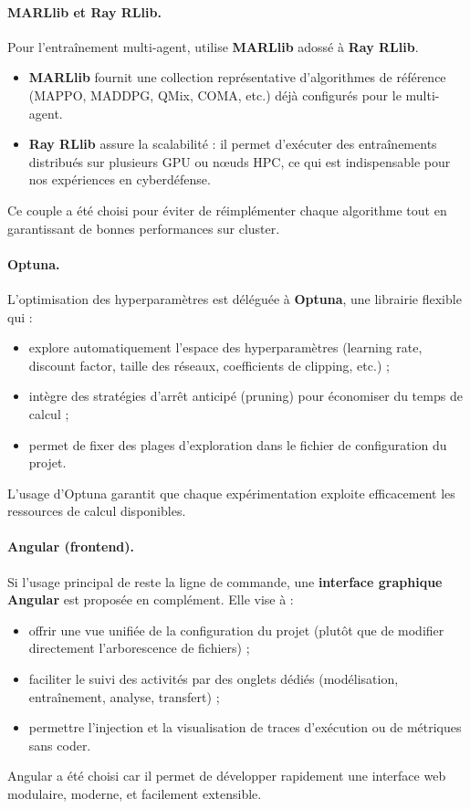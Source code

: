 \paragraph{MARLlib et Ray RLlib.}
Pour l'entraînement multi-agent,  utilise \textbf{MARLlib} adossé à \textbf{Ray RLlib}.
\begin{itemize}
  \item \textbf{MARLlib} fournit une collection représentative d'algorithmes de référence (MAPPO, MADDPG, QMix, COMA, etc.) déjà configurés pour le multi-agent.
  \item \textbf{Ray RLlib} assure la scalabilité : il permet d'exécuter des entraînements distribués sur plusieurs GPU ou nœuds HPC, ce qui est indispensable pour nos expériences en cyberdéfense.
\end{itemize}
Ce couple a été choisi pour éviter de réimplémenter chaque algorithme tout en garantissant de bonnes performances sur cluster.

\paragraph{Optuna.}
L'optimisation des hyperparamètres est déléguée à \textbf{Optuna}, une librairie flexible qui :
\begin{itemize}
  \item explore automatiquement l'espace des hyperparamètres (learning rate, discount factor, taille des réseaux, coefficients de clipping, etc.) ;
  \item intègre des stratégies d'arrêt anticipé (pruning) pour économiser du temps de calcul ;
  \item permet de fixer des plages d'exploration dans le fichier de configuration du projet.
\end{itemize}
L'usage d'Optuna garantit que chaque expérimentation exploite efficacement les ressources de calcul disponibles.

\paragraph{Angular (frontend).}
Si l'usage principal de  reste la ligne de commande, une \textbf{interface graphique Angular} est proposée en complément.
Elle vise à :
\begin{itemize}
  \item offrir une vue unifiée de la configuration du projet (plutôt que de modifier directement l'arborescence de fichiers) ;
  \item faciliter le suivi des activités par des onglets dédiés (modélisation, entraînement, analyse, transfert) ;
  \item permettre l'injection et la visualisation de traces d'exécution ou de métriques sans coder.
\end{itemize}
Angular a été choisi car il permet de développer rapidement une interface web modulaire, moderne, et facilement extensible.

